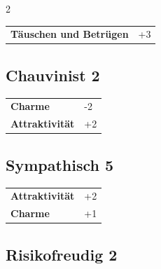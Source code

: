\begin{multicols}{2}
\begin{tcolorbox}
\begin{tabular}{@{}ll@{}}
    \textbf{Täuschen und Betrügen} & +3\\
\end{tabular}


\end{tcolorbox}

\begin{tcolorbox}
    \subsection*{Chauvinist \hfill \small{2 }}
    \tcblower




\begin{tabular}{@{}ll@{}}
    \textbf{Charme} & -2\\
    \textbf{Attraktivität} & +2\\
\end{tabular}


\end{tcolorbox}

\begin{tcolorbox}
    \subsection*{Sympathisch \hfill \small{5 }}
    \tcblower




\begin{tabular}{@{}ll@{}}
    \textbf{Attraktivität} & +2\\
    \textbf{Charme} & +1\\
\end{tabular}


\end{tcolorbox}

\begin{tcolorbox}
    \subsection*{Risikofreudig \hfill \small{2 }}
    \tcblower





\end{tcolorbox}
\end{multicols}
